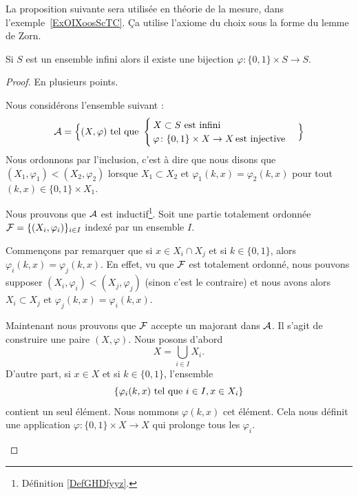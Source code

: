 La proposition suivante sera utilisée en théorie de la mesure, dans l'exemple~\ref{ExOIXoosScTC}. Ça utilise l'axiome du choix sous la forme du lemme de Zorn.
\begin{proposition} \label{PropVCSooMzmIX}
    Si \( S\) est un ensemble infini alors il existe une bijection \( \varphi\colon \{ 0,1 \}\times S\to S\).
\end{proposition}

\begin{proof}
    En plusieurs points.
    \begin{subproof}
        \item[Un gros ensemble]
            Nous considérons l'ensemble suivant :
                \begin{equation}
                   \mathcal{A}=\Big\{  (X,\varphi)  \text{ tel que }
                    \begin{cases}
                        X\subset S\text{ est infini}\\
                        \varphi\colon \{ 0,1 \}\times X\to X\,\text{est injective}
                    \end{cases}
                \Big\}
                \end{equation}
                Nous ordonnons par l'inclusion, c'est à dire que nous disons que \( (X_1,\varphi_1)<(X_2,\varphi_2)\) lorsque \( X_1\subset X_2\) et \( \varphi_1(k,x)=\varphi_2(k,x)\) pour tout \( (k,x)\in \{ 0,1 \}\times X_1\).
        \item[Il est inductif]
            Nous prouvons que \( \mathcal{A}\) est inductif\footnote{Définition \ref{DefGHDfyyz}.}. Soit une partie totalement ordonnée \( \mathcal{F}=\{ (X_i,\varphi_i) \}_{i\in I}\) indexé par un ensemble \( I\).

            Commençons par remarquer que si \( x\in X_i\cap X_j\) et si \( k\in \{ 0,1 \}\), alors \( \varphi_i(k,x)=\varphi_j(k,x)\). En effet, vu que \( \mathcal{F}\) est totalement ordonné, nous pouvons supposer \( (X_i,\varphi_i)<(X_j,\varphi_j)\) (sinon c'est le contraire) et nous avons alors \( X_i\subset X_j\) et \( \varphi_j(k,x)=\varphi_i(k,x)\).

            Maintenant nous prouvons que \( \mathcal{F}\) accepte un majorant dans \( \mathcal{A}\). Il s'agit de construire une paire \( (X,\varphi)\). Nous posons d'abord
            \begin{equation}
                X=\bigcup_{i\in I}X_i.
            \end{equation}
            D'autre part, si \( x\in X\) et si \( k\in \{ 0,1 \}\), l'ensemble 
            \begin{equation}
             \{ \varphi_i(k, x)\text{ tel que } i\in I, x\in X_i \}   
            \end{equation}
             contient un seul élément. Nous nommons \( \varphi(k,x)\) cet élément. Cela nous définit une application \( \varphi\colon \{ 0,1 \}\times X\to X \) qui prolonge tous les \( \varphi_i\).


\end{subproof}
\end{proof}
